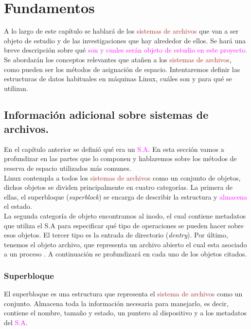 \cleardoublepage
\clearpage{}

\chapter[Fundamentos]{Fundamentos}
A lo largo de este capítulo se hablará de los \textcolor{brown}{sistemas de archivos} que van a ser objeto de estudio y de las investigaciones que hay alrededor de ellos. Se hará una breve descripción sobre qué \textcolor{magenta}{son y cuales serán objeto de estudio en este proyecto.} \\

Se abordarán los conceptos relevantes que atañen a los \textcolor{brown}{sistemas de archivos}, como pueden ser los métodos de asignación de espacio. Intentaremos definir las estructuras de datos habituales en máquinas Linux, cuáles son y para qué se utilizan. 


\section{Información adicional sobre sistemas de archivos.}
En el capítulo anterior se definió qué era un \textcolor{magenta}{S.A}. En esta sección vamos a profundizar en las partes que lo componen y hablaremos sobre los métodos de reserva de espacio utilizados más comunes.\\

Linux contempla a todos los \textcolor{brown}{sistemas de archivos} como un conjunto de objetos, dichos objetos se dividen principalmente en cuatro categorías. La primera de ellas, el superbloque (\textit{superblock}) se encarga de describir la estructura y \textcolor{magenta}{almacena} el estado. \\


 La segunda categoría de objeto encontramos al inodo, el cual contiene metadatos que utiliza el S.A para especificar qué tipo de operaciones se pueden hacer sobre esos objetos. El tercer tipo es la entrada de directorio (\textit{dentry}). Por último, tenemos el objeto archivo, que representa un archivo abierto el cual esta asociado a un proceso \cite{jones_2007}. A continuación se profundizará en cada uno de los objetos citados.\\


\subsection{Superbloque}
El superbloque es una estructura que representa el \textcolor{brown}{sistema de archivos} como un conjunto. Almacena toda la información necesaria para manejarlo, es decir, contiene el nombre, tamaño y estado, un puntero al dispositivo y a los metadatos del \textcolor{magenta}{S.A}.

